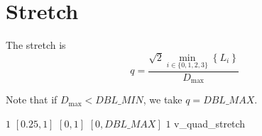 \section{Stretch}

The stretch is
\[
q = \frac{ \sqrt{2} \min_{i\in\{0,1,2,3\}}\left\{L_i\right\} }{ D_{\max} }
\]

Note that if $D_{\max} < DBL\_MIN$, we take $q = DBL\_MAX$.

%
{$1$}%
{$[0.25,1]$}%
{$[0,1]$}%
{$[0,DBL\_MAX]$}%
{$1$}%
{\cite{fimesh:xx}}%
{v\_quad\_stretch}%

